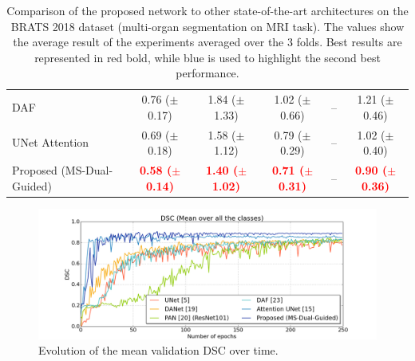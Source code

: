 \documentclass[journal]{IEEEtran}
\begin{document}
\begin{table}[t!]
\begin{tabular}{lcccc|c}
DAF \cite{wang18d}  & 0.76 ($\pm$0.17) & 1.84 ($\pm$1.33) & 1.02 ($\pm$0.66)& -- &  1.21 ($\pm$0.46)  \\
UNet Attention \cite{schlemper2019attention}  & 0.69 ($\pm$0.18) & 1.58 ($\pm$1.12) &  0.79 ($\pm$0.29) & --&  1.02 ($\pm$0.40)  \\
Proposed (MS-Dual-Guided)  & \textcolor{red}{\textbf{0.58 ($\pm$0.14)}}  & \textcolor{red}{\textbf{1.40 ($\pm$1.02)}}&  \textcolor{red}{\textbf{0.71 ($\pm$0.31)}} & -- &  \textcolor{red}{\textbf{0.90 ($\pm$0.36)}} \\
\midrule
\midrule
\end{tabular}

\caption{Comparison of the proposed network to other state-of-the-art architectures on the BRATS 2018 dataset (multi-organ segmentation on MRI task). The values show the average result of the experiments averaged over the 3 folds. Best results are represented in red bold, while blue is used to highlight the second best performance.}
\label{table:sota_comp_supplemental_brats}
\end{table}


\begin{figure}[h!]
    \centering
    \includegraphics[width=.525\textwidth]{DSC_Evolution.png}
    \caption{Evolution of the mean validation DSC over time.}
    \label{fig:DSC_Evolution}
\end{figure}
\end{document}
